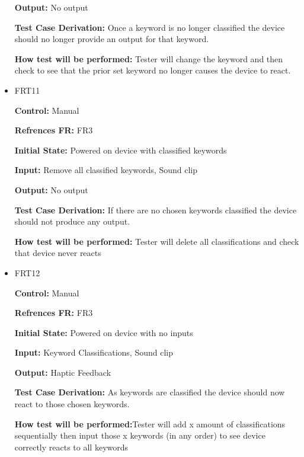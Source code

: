 \documentclass[12pt, titlepage]{article}
\begin{document}
\begin{itemize}
\textbf{Output:} No output

\textbf{Test Case Derivation:} Once a keyword is no longer classified the device should no longer provide an output for that keyword.
					
\textbf{How test will be performed:} Tester will change the keyword and then check to see that the prior set keyword no longer causes the device to react.


\item{FRT11}

\textbf{Control:} Manual 

\textbf{Refrences FR:} FR3 					

\textbf{Initial State:} Powered on device with classified keywords
					
\textbf{Input:} Remove all classified keywords, Sound clip
					
\textbf{Output:} No output

\textbf{Test Case Derivation:} If there are no chosen keywords classified the device should not produce any output.
					
\textbf{How test will be performed:} Tester will delete all classifications and check that device never reacts


\item{FRT12}

\textbf{Control:} Manual

\textbf{Refrences FR:} FR3 					

\textbf{Initial State:} Powered on device with no inputs
					
\textbf{Input:} Keyword Classifications, Sound clip
					
\textbf{Output:} Haptic Feedback

\textbf{Test Case Derivation:} As keywords are classified the device should now react to those chosen keywords.
					
\textbf{How test will be performed:}Tester will add x amount of classifications sequentially then input those x keywords (in any order) to see device correctly reacts to all keywords



\end{itemize}
\end{document}
